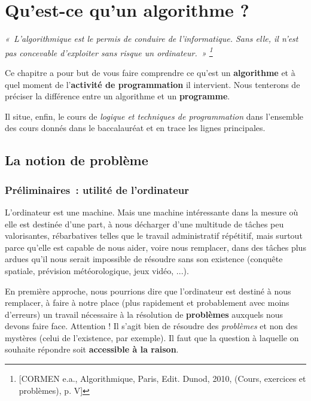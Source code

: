 \chapter{Qu'est-ce qu'un algorithme ?}

\begin{center}
	\textit{«~L'algorithmique est le permis de conduire de l'informatique.
	Sans elle, il n'est pas concevable d'exploiter sans risque un ordinateur.~»
	\footnote{[CORMEN e.a., Algorithmique, Paris, Edit. Dunod, 2010, (Cours, 
	exercices et problèmes), p. V] }}
\end{center}

Ce chapitre a pour but de vous faire comprendre ce
qu'est un \textbf{algorithme} et à quel moment de
l'\textbf{activité de programmation} il intervient. 
Nous tenterons de préciser la différence entre un algorithme 
et un \textbf{programme}.

Il situe, enfin, le cours de \textit{logique et techniques de
programmation} dans l’ensemble des cours donnés dans le baccalauréat et
en trace les lignes principales.

\section{La notion de problème}

	\subsection{Préliminaires~: utilité de l’ordinateur}
	
		L’ordinateur est une machine. Mais une machine intéressante dans la
		mesure où elle est destinée d’une part, à nous décharger d’une
		multitude de tâches peu valorisantes, rébarbatives telles que le
		travail administratif répétitif, mais surtout parce qu’elle est capable
		de nous aider, voire nous remplacer, dans des tâches plus ardues qu’il
		nous serait impossible de résoudre sans son existence (conquête
		spatiale, prévision météorologique, jeux vidéo, ...).
		
		En première approche, nous pourrions dire que l’ordinateur est destiné à
		nous remplacer, à faire à notre place (plus rapidement et probablement
		avec moins d’erreurs) un travail nécessaire à la résolution de
		\textbf{problèmes} auxquels nous devons faire face. Attention ! Il
		s’agit bien de résoudre des \textit{problèmes} et non des mystères
		(celui de l’existence, par exemple). Il faut que la question à laquelle
		on souhaite répondre soit \textbf{accessible à la raison}.

